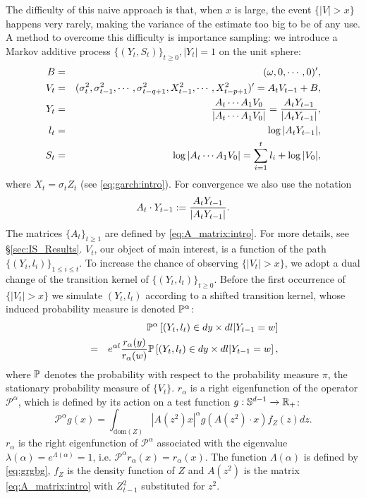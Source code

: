 The difficulty of this naive approach is that, when $x$ is large,
the event $\{|V| > x\}$ happens very rarely, making the variance of
the estimate too big to be of any use. A method to overcome this
difficulty is importance sampling: we introduce a Markov additive
process $\{(Y_t, S_t)\}_{t \geq 0}, |Y_t| = 1$ on the unit sphere:
\begin{eqnarray*}
  B &=& (\omega, 0, \cdots, 0)', \\
  V_t &=& (\sigma_t^2, \sigma_{t-1}^2, \cdots, \sigma_{t-q+1}^2,
  X_{t-1}^2, \cdots, X_{t-p+1}^2)' = A_t V_{t-1} + B,\\
  Y_t &=& {A_t \cdots A_1 V_0 \over |A_t \cdots A_1 V_0|}
  = {A_t Y_{t-1} \over |A_t Y_{t-1}|},\\
  l_t &=& \log |A_t Y_{t-1}|, \\
  S_t &=& \log |A_t \cdots A_1 V_0|
  = \sum_{i=1}^t l_i + \log |V_0|,
\end{eqnarray*}
where $X_t = \sigma_t Z_t$ (see \eqref{eq:garch:intro}). For
convergence we also use the notation 
\[
A_t \cdot Y_{t-1} := {A_t Y_{t-1} \over |A_t Y_{t-1}|}.
\]
The matrices $\{A_t\}_{t \geq 1}$ are defined by
\eqref{eq:A_matrix:intro}. For more details, see
\S\ref{sec:IS_Results}.
$V_t$, our object of main interest, is a function of the path
$\{(Y_i, l_i)\}_{1 \leq i \leq t}$. To increase the chance of
observing $\{|V_t| > x\}$, we adopt a dual change of the transition
kernel of $\{(Y_t, l_t)\}_{t \geq 0}$. Before the first occurrence of
$\{|V_t| > x\}$ we simulate $(Y_t, l_t)$ according to a shifted
transition kernel, whose induced probability measure is denoted
$\P^\alpha$:
\begin{eqnarray}
  &&
  \P^\alpha \left[
    (Y_t, l_t) \in dy \times dl | Y_{t-1} = w
    \right] \nonumber \\
  &=&
  e^{\alpha l} {r_\alpha(y) \over r_\alpha(w)}
  \P\left[
    (Y_t, l_t) \in dy \times dl | Y_{t-1} = w
    \right], \label{eq:pgrtgpd}
\end{eqnarray}
where $\P$ denotes the probability with respect to the probability
measure $\pi$, the stationary probability measure of $\{V_t\}$.
$r_\alpha$ is a right eigenfunction of the operator
$\mathscr P^\alpha$, which is defined by its action on
a test function $g: \sphere^{d-1} \to \reals_+$:
\[
\mathscr P^\alpha g(x) = \int_{\text{dom}(Z)} |A(z^2) x|^\alpha
g(A(z^2) \cdot x) f_{Z}(z) dz.
\]
$r_\alpha$ is the right eigenfunction of $\mathscr P^\alpha$
associated with the eigenvalue
$\lambda(\alpha) = e^{\Lambda(\alpha)} = 1$, i.e.
$\mathscr P^\alpha r_\alpha(x) = r_\alpha(x)$.
The function $\Lambda(\alpha)$ is defined by \eqref{eq:grgbg},
$f_{Z}$ is the density function of $Z$ and $A(z^2)$ is the matrix
\eqref{eq:A_matrix:intro} with $Z_{t-1}^2$ substituted for $z^2$.

